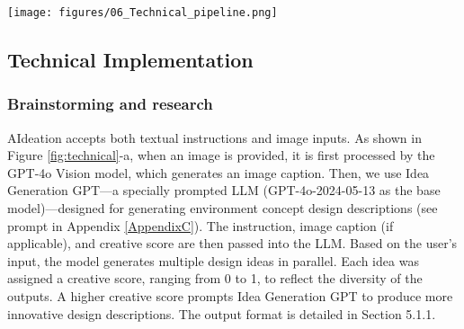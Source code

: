 \begin{figure*}
    \centering
    \texttt{[image: figures/06\_Technical\_pipeline.png]}
    \caption{Technical pipeline of AIdeation: (a) The user’s input image is captioned by a vision model and processed by Idea Generation GPT, which integrates instructions and creative score to generate design ideas description. This idea is then converted into keywords, and DALL-E 3 generates an image with the idea description. (b) User-selected keywords initiate a Bing Image Search, returning a set of relevant images. When the user wants to refine the idea, (c) a selected reference is captioned by a vision model and processed by Combine Reference GPT, merging it with the original idea to create modified designs based on the creative score. (d) In contrast, AIdeation also supports refining ideas by instruction. The original idea and user instructions are processed by Refine by Instruction GPT, along with the creative score, to generate additional refined ideas.}
    \label{fig:technical}
\end{figure*}


\subsection{Technical Implementation}
\subsubsection{Brainstorming and research}
AIdeation accepts both textual instructions and image inputs. As shown in Figure \ref{fig:technical}-a, when an image is provided, it is first processed by the GPT-4o Vision model, which generates an image caption. Then, we use Idea Generation GPT—a specially prompted LLM (GPT-4o-2024-05-13 as the base model)—designed for generating environment concept design descriptions (see prompt in Appendix \ref{AppendixC}). The instruction, image caption (if applicable), and creative score are then passed into the LLM. Based on the user’s input, the model generates multiple design ideas in parallel. Each idea was assigned a creative score, ranging from 0 to 1, to reflect the diversity of the outputs. A higher creative score prompts Idea Generation GPT to produce more innovative design descriptions. The output format is detailed in Section 5.1.1.


